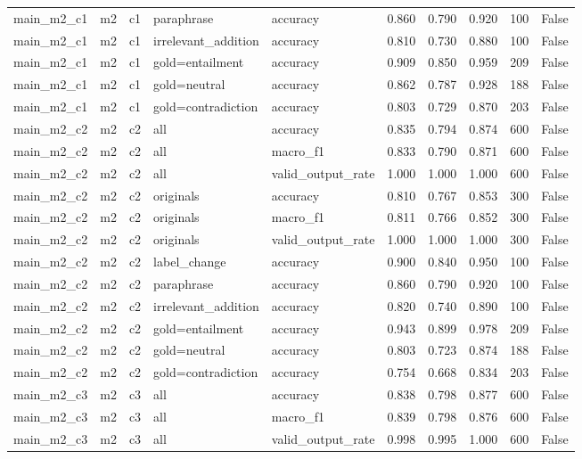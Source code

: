 \begin{tabular}{llllllllll}
main\_m2\_c1 & m2 & c1 & paraphrase & accuracy & 0.860 & 0.790 & 0.920 & 100 & False \\
main\_m2\_c1 & m2 & c1 & irrelevant\_addition & accuracy & 0.810 & 0.730 & 0.880 & 100 & False \\
main\_m2\_c1 & m2 & c1 & gold=entailment & accuracy & 0.909 & 0.850 & 0.959 & 209 & False \\
main\_m2\_c1 & m2 & c1 & gold=neutral & accuracy & 0.862 & 0.787 & 0.928 & 188 & False \\
main\_m2\_c1 & m2 & c1 & gold=contradiction & accuracy & 0.803 & 0.729 & 0.870 & 203 & False \\
main\_m2\_c2 & m2 & c2 & all & accuracy & 0.835 & 0.794 & 0.874 & 600 & False \\
main\_m2\_c2 & m2 & c2 & all & macro\_f1 & 0.833 & 0.790 & 0.871 & 600 & False \\
main\_m2\_c2 & m2 & c2 & all & valid\_output\_rate & 1.000 & 1.000 & 1.000 & 600 & False \\
main\_m2\_c2 & m2 & c2 & originals & accuracy & 0.810 & 0.767 & 0.853 & 300 & False \\
main\_m2\_c2 & m2 & c2 & originals & macro\_f1 & 0.811 & 0.766 & 0.852 & 300 & False \\
main\_m2\_c2 & m2 & c2 & originals & valid\_output\_rate & 1.000 & 1.000 & 1.000 & 300 & False \\
main\_m2\_c2 & m2 & c2 & label\_change & accuracy & 0.900 & 0.840 & 0.950 & 100 & False \\
main\_m2\_c2 & m2 & c2 & paraphrase & accuracy & 0.860 & 0.790 & 0.920 & 100 & False \\
main\_m2\_c2 & m2 & c2 & irrelevant\_addition & accuracy & 0.820 & 0.740 & 0.890 & 100 & False \\
main\_m2\_c2 & m2 & c2 & gold=entailment & accuracy & 0.943 & 0.899 & 0.978 & 209 & False \\
main\_m2\_c2 & m2 & c2 & gold=neutral & accuracy & 0.803 & 0.723 & 0.874 & 188 & False \\
main\_m2\_c2 & m2 & c2 & gold=contradiction & accuracy & 0.754 & 0.668 & 0.834 & 203 & False \\
main\_m2\_c3 & m2 & c3 & all & accuracy & 0.838 & 0.798 & 0.877 & 600 & False \\
main\_m2\_c3 & m2 & c3 & all & macro\_f1 & 0.839 & 0.798 & 0.876 & 600 & False \\
main\_m2\_c3 & m2 & c3 & all & valid\_output\_rate & 0.998 & 0.995 & 1.000 & 600 & False \\

\end{tabular}
